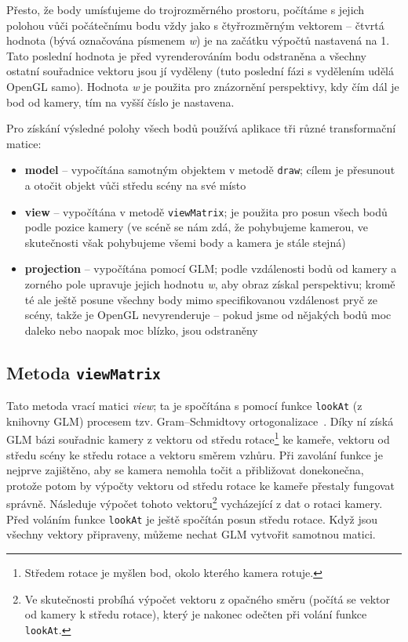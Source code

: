 \documentclass[a4paper, 11pt]{report}
\begin{document}
Přesto, že body umísťujeme do trojrozměrného prostoru, počítáme s jejich polohou vůči počátečnímu bodu vždy jako s čtyřrozměrným vektorem -- čtvrtá hodnota (bývá označována písmenem \emph{w}) je na začátku výpočtů nastavená na 1. Tato poslední hodnota je před vyrenderováním bodu odstraněna a všechny ostatní souřadnice vektoru jsou jí vyděleny (tuto poslední fázi s vydělením udělá OpenGL samo). Hodnota \emph{w} je použita pro znázornění perspektivy, kdy čím dál je bod od kamery, tím na vyšší číslo je nastavena.

Pro získání výsledné polohy všech bodů používá aplikace tři různé transformační matice:
\begin{itemize}
    \item \textbf{model} -- vypočítána samotným objektem v metodě \texttt{draw}; cílem je přesunout a otočit objekt vůči středu scény na své místo
    \item \textbf{view} -- vypočítána v metodě \texttt{viewMatrix}; je použita pro posun všech bodů podle pozice kamery (ve scéně se nám zdá, že pohybujeme kamerou, ve skutečnosti však pohybujeme všemi body a kamera je stále stejná)
    \item \textbf{projection} -- vypočítána pomocí GLM; podle vzdálenosti bodů od kamery a zorného pole upravuje jejich hodnotu \emph{w}, aby obraz získal perspektivu; kromě té ale ještě posune všechny body mimo specifikovanou vzdálenost pryč ze scény, takže je OpenGL nevyrenderuje -- pokud jsme od nějakých bodů moc daleko nebo naopak moc blízko, jsou odstraněny
\end{itemize}

\subsection{Metoda \texttt{viewMatrix}}
Tato metoda vrací matici \emph{view}; ta je spočítána s pomocí funkce \texttt{lookAt} (z knihovny GLM) procesem tzv. Gram–Schmidtovy ortogonalizace~\cite{libre:ortogonalizace}. Díky ní získá GLM bázi souřadnic kamery z vektoru od středu rotace\footnote{\label{rotace}Středem rotace je myšlen bod, okolo kterého kamera rotuje.} ke kameře, vektoru od středu scény ke středu rotace a vektoru směrem vzhůru. Při zavolání funkce je nejprve zajištěno, aby se kamera nemohla točit a přibližovat donekonečna, protože potom by výpočty vektoru od středu rotace ke kameře přestaly fungovat správně. Následuje výpočet tohoto vektoru\footnote{Ve skutečnosti probíhá výpočet vektoru z opačného směru (počítá se vektor od kamery k středu rotace), který je nakonec odečten při volání funkce \texttt{lookAt}.} vycházející z dat o rotaci kamery. Před voláním funkce \texttt{lookAt} je ještě spočítán posun středu rotace. Když jsou všechny vektory připraveny, můžeme nechat GLM vytvořit samotnou matici.
\end{document}
